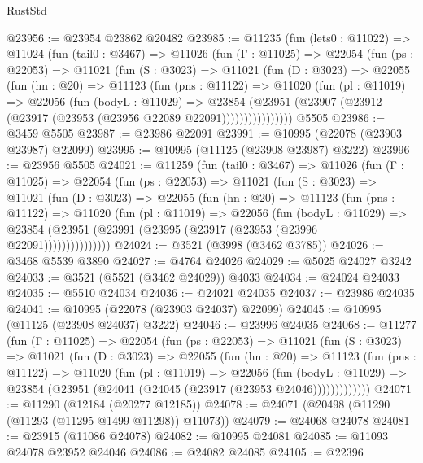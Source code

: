 \begin{lexlean}{RustStd}
\begin{coremodule}
@23956 := @23954 @23862 @20482
@23985 := @11235
    (fun (lets0 : @11022) =>
    @11024
      (fun (tail0 : @3467) =>
      @11026
        (fun (Γ : @11025) =>
        @22054
          (fun (ps : @22053) =>
          @11021
            (fun (S : @3023) =>
            @11021
              (fun (D : @3023) =>
              @22055
                (fun (hn : @20) =>
                @11123
                  (fun (pns : @11122) =>
                  @11020
                    (fun (pl : @11019) =>
                    @22056
                      (fun (bodyL : @11029) =>
                      @23854
                        (@23951
                          (@23907 (@23912 (@23917 (@23953 (@23956 @22089 @22091))))))))))))))))
    @5505
@23986 := @3459 @5505
@23987 := @23986 @22091
@23991 := @10995 (@22078 (@23903 @23987) @22099)
@23995 := @10995 (@11125 (@23908 @23987) @3222)
@23996 := @23956 @5505
@24021 := @11259
    (fun (tail0 : @3467) =>
    @11026
      (fun (Γ : @11025) =>
      @22054
        (fun (ps : @22053) =>
        @11021
          (fun (S : @3023) =>
          @11021
            (fun (D : @3023) =>
            @22055
              (fun (hn : @20) =>
              @11123
                (fun (pns : @11122) =>
                @11020
                  (fun (pl : @11019) =>
                  @22056
                    (fun (bodyL : @11029) =>
                    @23854 (@23951 (@23991 (@23995 (@23917 (@23953 (@23996 @22091)))))))))))))))
@24024 := @3521 (@3998 (@3462 @3785))
@24026 := @3468 @5539 @3890
@24027 := @4764 @24026
@24029 := @5025 @24027 @3242
@24033 := @3521 (@5521 (@3462 @24029)) @4033
@24034 := @24024 @24033
@24035 := @5510 @24034
@24036 := @24021 @24035
@24037 := @23986 @24035
@24041 := @10995 (@22078 (@23903 @24037) @22099)
@24045 := @10995 (@11125 (@23908 @24037) @3222)
@24046 := @23996 @24035
@24068 := @11277
    (fun (Γ : @11025) =>
    @22054
      (fun (ps : @22053) =>
      @11021
        (fun (S : @3023) =>
        @11021
          (fun (D : @3023) =>
          @22055
            (fun (hn : @20) =>
            @11123
              (fun (pns : @11122) =>
              @11020
                (fun (pl : @11019) =>
                @22056
                  (fun (bodyL : @11029) =>
                  @23854 (@23951 (@24041 (@24045 (@23917 (@23953 @24046)))))))))))))
@24071 := @11290 (@12184 (@20277 @12185))
@24078 := @24071 (@20498 (@11290 (@11293 (@11295 @1499 @11298)) @11073))
@24079 := @24068 @24078
@24081 := @23915 (@11086 @24078)
@24082 := @10995 @24081
@24085 := @11093 @24078 @23952 @24046
@24086 := @24082 @24085
@24105 := @22396

\end{coremodule}
\end{lexlean}

